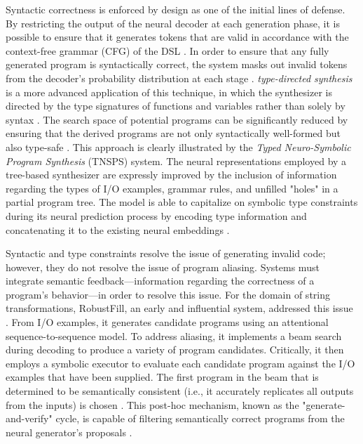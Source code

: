 \documentclass[12pt, a4paper]{report}
\begin{document}
Syntactic correctness is enforced by design as one of the initial lines of defense. By restricting the output of the neural decoder at each generation phase, it is possible to ensure that it generates tokens that are valid in accordance with the context-free grammar (CFG) of the DSL \citep{shiqi2019neuro}. In order to ensure that any fully generated program is syntactically correct, the system masks out invalid tokens from the decoder's probability distribution at each stage \citep{shah2020learning}. \textit{type-directed synthesis} is a more advanced application of this technique, in which the synthesizer is directed by the type signatures of functions and variables rather than solely by syntax \citep{silver2017mastering}.
The search space of potential programs can be significantly reduced by ensuring that the derived programs are not only syntactically well-formed but also type-safe \citep{sinha2019clutrr}. This approach is clearly illustrated by the \textit{Typed Neuro-Symbolic Program Synthesis}  (TNSPS) system. The neural representations employed by a tree-based synthesizer are expressly improved by the inclusion of information regarding the types of I/O examples, grammar rules, and unfilled "holes" in a partial program tree. The model is able to capitalize on symbolic type constraints during its neural prediction process by encoding type information and concatenating it to the existing neural embeddings \citep{hu2021iraven}.


Syntactic and type constraints resolve the issue of generating invalid code; however, they do not resolve the issue of program aliasing. Systems must integrate semantic feedback—information regarding the correctness of a program's behavior—in order to resolve this issue. For the domain of string transformations, RobustFill, an early and influential system, addressed this issue \citep{devlin2017robustfill}. From I/O examples, it generates candidate programs using an attentional sequence-to-sequence model. To address aliasing, it implements a beam search during decoding to produce a variety of program candidates. Critically, it then employs a symbolic executor to evaluate each candidate program against the I/O examples that have been supplied. The first program in the beam that is determined to be semantically consistent (i.e., it accurately replicates all outputs from the inputs) is chosen \citep{devlin2017robustfill}. This post-hoc mechanism, known as the "generate-and-verify" cycle, is capable of filtering semantically correct programs from the neural generator's proposals \citep{devlin2017robustfill}.
\end{document}
